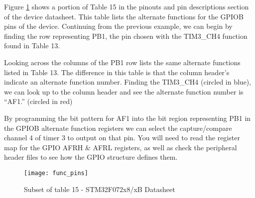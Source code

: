 \documentclass[openany,11pt,fleqn]{book} %
\begin{document}
   	
    \begin{example} 
        \label{example3}
Figure \ref{func_pins} shows a portion of Table 15 in the pinouts and pin descriptions section of the device datasheet. This table lists the alternate functions for the GPIOB pins of the device. Continuing from the previous example, we can begin by finding the row representing PB1, the pin chosen with the TIM3\_CH4 function found in Table 13. 

Looking across the columns of the PB1 row lists the same alternate functions listed in Table 13. The difference in this table is that the column header's indicate an alternate function number. Finding the TIM3\_CH4 (circled in blue), we can look up to the column header and see the alternate function number is ``AF1.'' (circled in red)

By programming the bit pattern for AF1 into the bit region representing PB1 in the GPIOB alternate function registers we can select the capture/compare channel 4 of timer 3 to output on that pin. You will need to read the register map for the GPIO AFRH \& AFRL registers, as well as check the peripheral header files to see how the GPIO structure defines them.  
    \end{example}

    \begin{figure}[]
    \centering\texttt{[image: func\_pins]}
    \caption{Subset of table 15 - STM32F072x8/xB Datasheet}
    \label{func_pins}
\end{figure}
    
\end{document}
